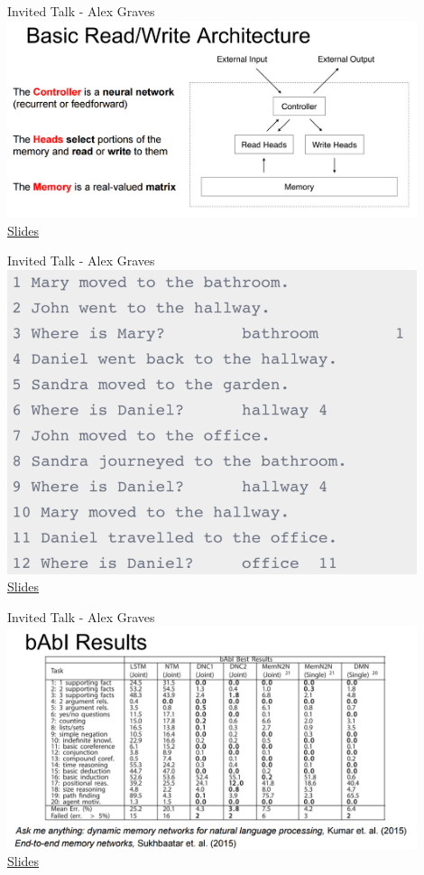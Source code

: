 \documentclass[]{beamer}
\begin{document}
\begin{frame}{Invited Talk - Alex Graves}
\centering
\includegraphics[width=0.9\textwidth]{figures/graves-architecture} \\
\href{http://iclr.cc/lib/exe/fetch.php?media=iclr2017:graves\_iclr2017.pdf}{Slides}
\end{frame}

\begin{frame}{Invited Talk - Alex Graves}
\centering
\includegraphics[width=0.9\textwidth]{figures/graves-babi} \\
\href{http://iclr.cc/lib/exe/fetch.php?media=iclr2017:graves\_iclr2017.pdf}{Slides}
\end{frame}

\begin{frame}{Invited Talk - Alex Graves}
\centering
\includegraphics[width=0.9\textwidth]{figures/graves-results} \\
\href{http://iclr.cc/lib/exe/fetch.php?media=iclr2017:graves\_iclr2017.pdf}{Slides}
\end{frame}
\end{document}
